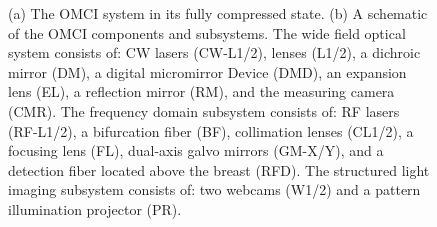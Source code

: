 \begin{figure}[]
    \begin{center}
    \end{center}
    \caption{(a) The OMCI system in its fully compressed state. (b) A schematic of the OMCI components and subsystems. The wide field optical system consists of: CW lasers (CW-L1/2), lenses (L1/2), a dichroic mirror (DM), a digital micromirror Device (DMD), an expansion lens (EL), a reflection mirror (RM), and the measuring camera (CMR). The frequency domain subsystem consists of: RF lasers (RF-L1/2), a bifurcation fiber (BF), collimation lenses (CL1/2), a focusing lens (FL), dual-axis galvo mirrors (GM-X/Y), and a detection fiber located above the breast (RFD). The structured light imaging subsystem consists of: two webcams (W1/2) and a pattern illumination projector (PR).} 
    \label{fig:OMCISystem}
\end{figure} 

